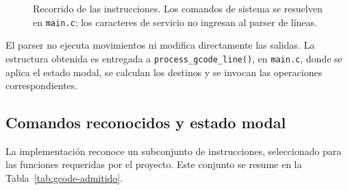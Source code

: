 \documentclass[blue,fullpaper]{ludusofficial}  %
\begin{document}
\begin{figure}[htbp]
\centering
{}
\caption{Recorrido de las instrucciones. Los comandos de sistema se resuelven en \texttt{main.c}; los caracteres de servicio no ingresan al parser de líneas.}
\label{fig:recepcion-parser}
\end{figure}

El parser no ejecuta movimientos ni modifica directamente
las salidas. La estructura obtenida es entregada a
\texttt{process\_gcode\_line()}, en \texttt{main.c},
donde se aplica el estado modal, se calculan los destinos
y se invocan las operaciones correspondientes.

\subsection{Comandos reconocidos y estado modal}

La implementación reconoce un subconjunto de instrucciones,
seleccionado para las funciones requeridas por el proyecto.
Este conjunto se resume en la Tabla~\ref{tab:gcode-admitido}.
\end{document}

